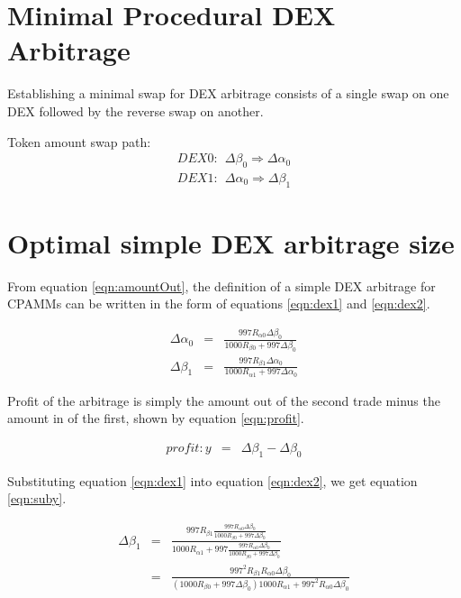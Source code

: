 \documentclass[runningheads]{llncs}
\begin{document}
\section{Minimal Procedural DEX Arbitrage}
Establishing a minimal swap for DEX arbitrage consists of a single swap on one DEX followed by the reverse swap on another.

Token amount swap path:
\begin{eqnarray}
	DEX0: \: \: \Delta\beta_{0} \Rightarrow \Delta\alpha_{0}\\
	DEX1: \: \: \Delta\alpha_{0} \Rightarrow \Delta\beta_{1}
\end{eqnarray}

\section{Optimal simple DEX arbitrage size}
From equation \ref{eqn:amountOut}, the definition of a simple DEX arbitrage for CPAMMs can be written in the form of equations \ref{eqn:dex1} and \ref{eqn:dex2}.

\begin{eqnarray}
	\Delta\alpha_{0}  &=& \frac{997 R_{\alpha 0} \Delta\beta_{0} }{1000 R_{\beta 0} + 997 \Delta\beta_{0}} \label{eqn:dex1}\\
	\Delta\beta_{1}  &=& \frac{997 R_{\beta 1} \Delta\alpha_{0} }{1000 R_{\alpha 1} + 997 \Delta\alpha_{0}} \label{eqn:dex2}
\end{eqnarray}

Profit of the arbitrage is simply the amount out of the second trade minus the amount in of the first, shown by equation \ref{eqn:profit}.

\begin{eqnarray}
	profit: y  &=& \Delta\beta_{1} - \Delta\beta_{0} \label{eqn:profit}
\end{eqnarray}


Substituting equation \ref{eqn:dex1} into equation \ref{eqn:dex2}, we get equation \ref{eqn:suby}.

\begin{eqnarray}
	\Delta\beta_{1}  &=& \frac{997 R_{\beta 1} \frac{997 R_{\alpha 0} \Delta\beta_{0} }{1000 R_{\beta 0} + 997 \Delta\beta_{0}} }{1000 R_{\alpha 1} + 997 \frac{997 R_{\alpha 0} \Delta\beta_{0} }{1000 R_{\beta 0} + 997 \Delta\beta_{0}}} \label{eqn:suby}\\
	&=& \frac{997^2 R_{\beta 1}  R_{\alpha 0} \Delta\beta_{0} }{(1000 R_{\beta 0} + 997 \Delta\beta_{0}) 1000 R_{\alpha 1} + 997^2 R_{\alpha 0} \Delta\beta_{0} } \label{eqn:subyMore}
\end{eqnarray}
\end{document}
